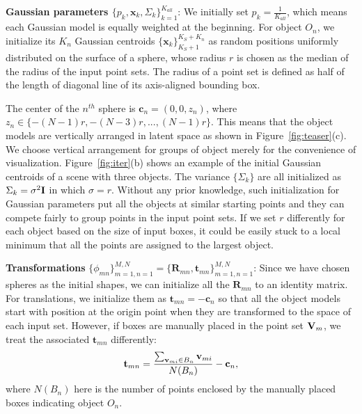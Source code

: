 \noindent\textbf{Gaussian parameters $\{p_k,\mathbf{x}_k,\Sigma_k\}_{k=1}^{K_{all}}$}:
We initially set $p_k=\frac{1}{K_{all}}$, which means each Gaussian model is equally weighted at the beginning. 
%
For object $O_n$, we initialize its $K_n$ Gaussian centroids $\{\mathbf{x}_k\}_{K_S+1}^{K_S+K_n}$ as random positions uniformly distributed on the surface of a sphere, whose radius $r$ is chosen as the median of the radius of the input point sets.
%
%
The radius of a point set is defined as half of the length of diagonal line of its axis-aligned bounding box.
 
%
The center of the $n^{th}$ sphere is $\mathbf{c}_n=(0,0,z_n)$, where $z_n\in \{-(N-1)r,-(N-3)r,...,(N-1)r\}$.
%
This means that the object models are vertically arranged in latent space as shown in Figure~\ref{fig:teaser}(c). 
%
We choose vertical arrangement for groups of object merely for the convenience of visualization.
%
Figure~\ref{fig:iter}(b) shows an example of the initial Gaussian centroids of a scene with three objects.
%
The variance $\{\Sigma_k\}$ are all initialized as $\Sigma_k=\sigma^2 \mathbf{I}$ in which $\sigma=r$.
%
Without any prior knowledge, such initialization for Gaussian parameters put all the objects at similar starting points and they can compete fairly to group points in the input point sets. If we set $r$ differently for each object based on the size of input boxes, it could be easily stuck to a local minimum that all the points are assigned to the largest object.

\noindent\textbf{Transformations} $\{\phi_{mn}\}_{m=1,n=1}^{M,N}=\{\mathbf{R}_{mn},\mathbf{t}_{mn}\}_{m=1,n=1}^{M,N}$:
Since we have chosen spheres as the initial shapes, we can initialize all the $\mathbf{R}_{mn}$ to an identity matrix.
%
%
For translations, we initialize them as $\mathbf{t}_{mn}=- \mathbf{c}_n$ so that all the object models start with position at the origin point when they are transformed to the space of each input set. 
%
However, if boxes are manually placed in the point set $\mathbf{V}_m$, we treat the associated $\mathbf{t}_{mn}$ differently:
%
\begin{equation}
	\label{equ:initt}
	\mathbf{t}_{mn}=\frac{\sum_{\mathbf{v}_{mi} \in B_n}\mathbf{v}_{mi}}{N(B_n)}-\mathbf{c}_n, 
\end{equation}
where $N(B_n)$ here is the number of points enclosed by the manually placed boxes indicating object $O_n$.


